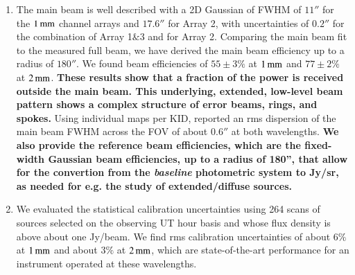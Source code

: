 \documentclass[traditionalabstract]{aa}
\newcommand{\bm}{{\tt beammap}}
\newcommand{\lp}[1]{\bf \color[RGB]{230, 0, 92} #1}
\begin{document}
\begin{enumerate}
\item %
  The main beam is well described with a 2D
  Gaussian of FWHM of $11''$ for the $1\,\rm{mm}$ channel arrays
  and $17.6''$ for Array 2, with uncertainties of $0.2''$ for the
  combination of Array 1$\&$3 and for Array 2.
  Comparing the main beam fit to the measured full beam, we have derived the
  main beam efficiency up to a radius of $180''$. We found beam
  efficiencies of $55 \pm 3 \%$ at $1\,\rm{mm}$ and $77 \pm 2 \%$ at
  $2\,\rm{mm}$.
  {\lp These results show that a fraction of the power is received
    outside the main beam. This underlying,
    extended, low-level beam pattern shows a complex structure of error 
    beams, rings, and spokes.}
  Using individual maps per KID, \citet{Adam2018} reported an rms
  dispersion of the main beam FWHM across the FOV of about $0.6''$ at
  both wavelengths.
  {\lp We also provide the reference beam efficiencies, which are the
    fixed-width Gaussian beam efficiencies, up to a radius
    of 180'', that allow for the convertion from the \emph{baseline} 
    photometric system to Jy/sr, as needed for e.g. the study of
    extended/diffuse sources.}
%
\item %
  We evaluated the statistical calibration uncertainties using 264 
  scans of sources selected on the observing UT hour basis and whose
  flux density is above about one Jy/beam. We find rms calibration
  uncertainties of about $6\%$ at $1\,\rm{mm}$ and about $3\%$ at
  $2\,\rm{mm}$, which are state-of-the-art performance for an instrument
  operated at these wavelengths. 
  

\end{enumerate}
\end{document}
